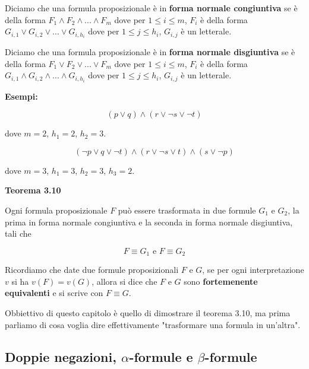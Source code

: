 \begin{flushleft}
\bigskip

Diciamo che una formula proposizionale è in \textbf{forma normale congiuntiva} se
è della forma $F_1 \land F_2 \land ... \land F_m$ dove per $1 \le i \le m$, $F_i$
è della forma $G_{i,1} \lor G_{i,2} \lor ... \lor G_{i,h_i}$ dove per 
$1 \le j \le h_i$, $G_{i, j}$ è un letterale.

\medskip

Diciamo che una formula proposizionale è in \textbf{forma normale disgiuntiva} se
è della forma $F_1 \lor F_2 \lor ... \lor F_m$ dove per $1 \le i \le m$, $F_i$
è della forma $G_{i,1} \land G_{i,2} \land ... \land G_{i,h_i}$ dove per 
$1 \le j \le h_i$, $G_{i, j}$ è un letterale.

\bigskip

\textbf{Esempi:}

\[(p \lor q) \land (r \lor \neg s \lor \neg t)\]

dove $m = 2$, $h_1 = 2$, $h_2 = 3$.

\medskip

\[(\neg p \lor q \lor \neg t) \land (r \lor \neg s \lor t) \land (s \lor \neg p)\]

dove $m = 3$, $h_1 = 3$, $h_2 = 3$, $h_3 = 2$.

\bigskip

\textbf{Teorema 3.10}

Ogni formula proposizionale $F$ può essere trasformata in due formule $G_1$ e $G_2$,
la prima in forma normale congiuntiva e la seconda in forma normale disgiuntiva, tali che

\[ F \equiv G_1 \text{ e } F \equiv G_2 \]

\medskip

Ricordiamo che date due formule proposizionali $F$ e $G$, se per ogni interpretazione $v$
si ha $v(F) = v(G)$, allora si dice che $F$ e $G$ sono \textbf{fortemenente equivalenti} e 
si scrive con $F \equiv G$.

\bigskip

Obbiettivo di questo capitolo è quello di dimostrare il teorema 3.10, ma prima parliamo
di cosa voglia dire effettivamente "trasformare una formula in un'altra".

\end{flushleft}

\subsection{Doppie negazioni, $\alpha$-formule e $\beta$-formule}

